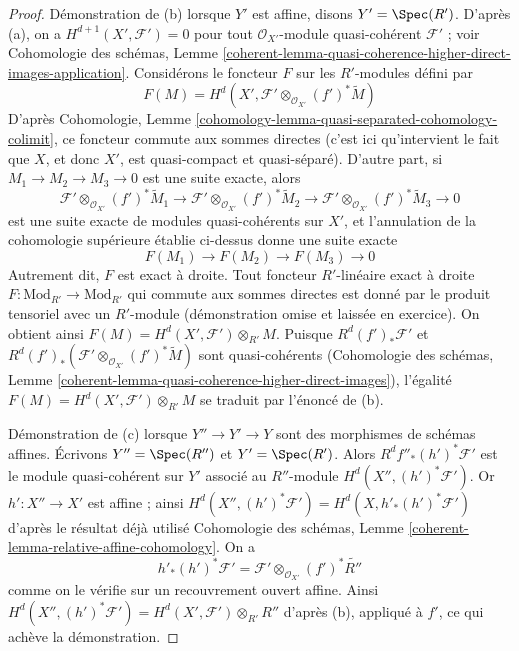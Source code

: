 \begin{proof}
\medskip\noindent
Démonstration de (b) lorsque $Y'$ est affine, disons $Y' = \Spec(R')$.
D'après (a), on a $H^{d + 1}(X', \mathcal{F}') = 0$
pour tout $\mathcal{O}_{X'}$-module quasi-cohérent $\mathcal{F}'$ ; voir
Cohomologie des schémas, Lemme
\ref{coherent-lemma-quasi-coherence-higher-direct-images-application}.
Considérons le foncteur $F$ sur les $R'$-modules défini par
$$
F(M) = H^d(X', \mathcal{F}' \otimes_{\mathcal{O}_{X'}} (f')^*\widetilde{M})
$$
D'après Cohomologie, Lemme \ref{cohomology-lemma-quasi-separated-cohomology-colimit},
ce foncteur commute aux sommes directes (c'est ici qu'intervient le fait que
$X$, et donc $X'$, est quasi-compact et quasi-séparé).
D'autre part, si $M_1 \to M_2 \to M_3 \to 0$ est une suite exacte,
alors
$$
\mathcal{F}' \otimes_{\mathcal{O}_{X'}} (f')^*\widetilde{M}_1 \to
\mathcal{F}' \otimes_{\mathcal{O}_{X'}} (f')^*\widetilde{M}_2 \to
\mathcal{F}' \otimes_{\mathcal{O}_{X'}} (f')^*\widetilde{M}_3 \to 0
$$
est une suite exacte de modules quasi-cohérents sur $X'$,
et l'annulation de la cohomologie supérieure établie ci-dessus donne une suite exacte
$$
F(M_1) \to F(M_2) \to F(M_3) \to 0
$$
Autrement dit, $F$ est exact à droite. Tout foncteur $R'$-linéaire exact à droite
$F : \text{Mod}_{R'} \to \text{Mod}_{R'}$
qui commute aux sommes directes est donné par le produit tensoriel avec un $R'$-module
(démonstration omise et laissée en exercice).
On obtient ainsi $F(M) = H^d(X', \mathcal{F}') \otimes_{R'} M$.
Puisque $R^d(f')_*\mathcal{F}'$ et
$R^d(f')_*(\mathcal{F}' \otimes_{\mathcal{O}_{X'}} (f')^*\widetilde{M})$
sont quasi-cohérents (Cohomologie des schémas, Lemme
\ref{coherent-lemma-quasi-coherence-higher-direct-images}),
l'égalité $F(M) = H^d(X', \mathcal{F}') \otimes_{R'} M$
se traduit par l'énoncé de (b).

\medskip\noindent
Démonstration de (c) lorsque $Y'' \to Y' \to Y$ sont des morphismes de schémas affines.
Écrivons $Y'' = \Spec(R'')$ et $Y' = \Spec(R')$.
Alors $R^df''_*(h')^*\mathcal{F}'$
est le module quasi-cohérent sur $Y'$ associé au $R''$-module
$H^d(X'', (h')^*\mathcal{F}')$. Or $h' : X'' \to X'$ est affine ;
ainsi $H^d(X'', (h')^*\mathcal{F}') = H^d(X, h'_*(h')^*\mathcal{F}')$
d'après le résultat déjà utilisé
Cohomologie des schémas, Lemme \ref{coherent-lemma-relative-affine-cohomology}.
On a
$$
h'_*(h')^*\mathcal{F}' =
\mathcal{F}' \otimes_{\mathcal{O}_{X'}} (f')^*\widetilde{R''}
$$
comme on le vérifie sur un recouvrement ouvert affine. Ainsi
$H^d(X'', (h')^*\mathcal{F}') = H^d(X', \mathcal{F}') \otimes_{R'} R''$
d'après (b), appliqué à $f'$, ce qui achève la démonstration.
\end{proof}

